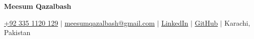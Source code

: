 \begin{center}
    \textbf{\Huge Meesum Qazalbash} \\ \vspace{3pt}

    \faMobile \hspace{.5pt} \href{tel:923351120129}{+92 335 1120 129}
    $\mid$
    \faAt \hspace{.5pt} \href{mailto:meesumqazalbash@gmail.com}{meesumqazalbash@gmail.com}
    $\mid$
    \faLinkedinSquare \hspace{.5pt} \href{https://www.linkedin.com/in/meesumaliqazalbash}{LinkedIn}
    $\mid$
    \faGithub \hspace{.5pt} \href{https://github.com/Qazalbash}{GitHub}
    $\mid$
    \faMapMarker \hspace{.5pt} Karachi, Pakistan
\end{center}